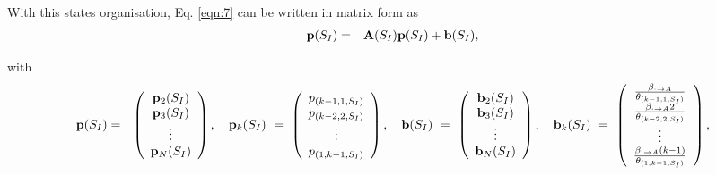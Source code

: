 \documentclass[10pt,A4paper]{article}
\begin{document}
\par\noindent With this states organisation, Eq. \eqref{eqn:7} can be written in matrix form as
\begin{eqnarray}\label{eqn:8}
 {\bf p}(S_I) &=& {\bf A}(S_I){\bf p}(S_I)+{\bf b}(S_I),
\end{eqnarray}
\par\noindent with
\begin{eqnarray*}
 {\bf p}(S_I) &=& \left(\begin{array}{c}
                         {\bf p}_2(S_I)\\
{\bf p}_3(S_I)\\
\vdots\\
{\bf p}_N(S_I)
\end{array}\right),\quad {\bf p}_k(S_I) \ = \ \left(\begin{array}{c}
p_{(k-1,1,S_I)}\\
p_{(k-2,2,S_I)}\\
\vdots\\
p_{(1,k-1,S_I)}
\end{array}\right),\quad
{\bf b}(S_I) \ = \ \left(\begin{array}{c}
                          {\bf b}_2(S_I)\\
{\bf b}_3(S_I)\\
\vdots\\
{\bf b}_N(S_I)
                         \end{array}\right),\quad
{\bf b}_k(S_I) \ = \ \left(\begin{array}{c}
               \frac{\beta_{\cdot\rightarrow A}}{\theta_{(k-1,1,S_I)}}\\
\frac{\beta_{\cdot\rightarrow A}2}{\theta_{(k-2,2,S_I)}}\\
\vdots\\
\frac{\beta_{\cdot\rightarrow A}(k-1)}{\theta_{(1,k-1,S_I)}}\\
                         \end{array}\right),
\end{eqnarray*}
\end{document}
